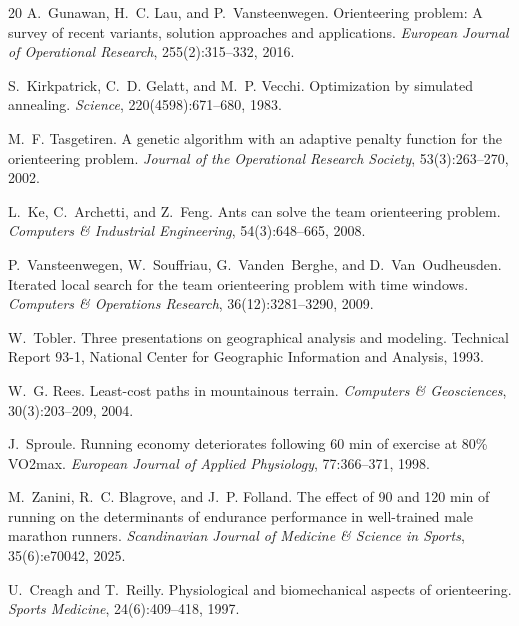 \documentclass[preprint,11pt]{elsarticle}
\begin{document}
\begin{thebibliography}{20}
A.~Gunawan, H.~C. Lau, and P.~Vansteenwegen.
\newblock Orienteering problem: A survey of recent variants, solution approaches and applications.
\newblock \emph{European Journal of Operational Research}, 255(2):315--332, 2016.

S.~Kirkpatrick, C.~D. Gelatt, and M.~P. Vecchi.
\newblock Optimization by simulated annealing.
\newblock \emph{Science}, 220(4598):671--680, 1983.

M.~F. Tasgetiren.
\newblock A genetic algorithm with an adaptive penalty function for the orienteering problem.
\newblock \emph{Journal of the Operational Research Society}, 53(3):263--270, 2002.

L.~Ke, C.~Archetti, and Z.~Feng.
\newblock Ants can solve the team orienteering problem.
\newblock \emph{Computers \& Industrial Engineering}, 54(3):648--665, 2008.

P.~Vansteenwegen, W.~Souffriau, G.~Vanden~Berghe, and D.~Van~Oudheusden.
\newblock Iterated local search for the team orienteering problem with time windows.
\newblock \emph{Computers \& Operations Research}, 36(12):3281--3290, 2009.

W.~Tobler.
\newblock Three presentations on geographical analysis and modeling.
\newblock Technical Report 93-1, National Center for Geographic Information and Analysis, 1993.

W.~G. Rees.
\newblock Least-cost paths in mountainous terrain.
\newblock \emph{Computers \& Geosciences}, 30(3):203--209, 2004.

J.~Sproule.
\newblock Running economy deteriorates following 60 min of exercise at 80\% {VO2max}.
\newblock \emph{European Journal of Applied Physiology}, 77:366--371, 1998.

M.~Zanini, R.~C. Blagrove, and J.~P. Folland.
\newblock The effect of 90 and 120 min of running on the determinants of endurance performance in well-trained male marathon runners.
\newblock \emph{Scandinavian Journal of Medicine \& Science in Sports}, 35(6):e70042, 2025.

U.~Creagh and T.~Reilly.
\newblock Physiological and biomechanical aspects of orienteering.
\newblock \emph{Sports Medicine}, 24(6):409--418, 1997.


\end{thebibliography}
\end{document}
